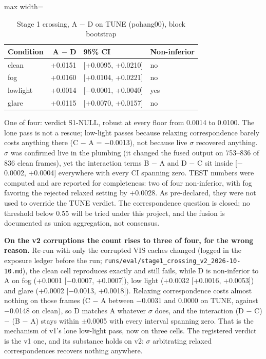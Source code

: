 \documentclass[journal,onecolumn]{IEEEtran}
\begin{document}
\begin{table}[htbp]
\centering
\small
\caption{Stage 1 crossing, A $-$ D on TUNE (pohang00), block bootstrap}
\label{tab:13}
\begin{adjustbox}{max width=\linewidth}
\begin{tabular}{lrll}
\toprule
Condition & A $-$ D & 95\% CI & Non-inferior \\
\midrule
clean & +0.0151 & [+0.0095, +0.0210] & no \\
fog & +0.0160 & [+0.0104, +0.0221] & no \\
lowlight & +0.0014 & [$-$0.0001, +0.0040] & yes \\
glare & +0.0115 & [+0.0070, +0.0157] & no \\
\bottomrule
\end{tabular}
\end{adjustbox}
\end{table}
One of four: verdict S1-NULL, robust at every floor from 0.0014 to 0.0100. The lone pass is not a rescue; low-light passes because relaxing correspondence barely costs anything there (C $-$ A = $-$0.0013), not because live $\sigma$ recovered anything. $\sigma$ was confirmed live in the plumbing (it changed the fused output on 753--836 of 836 clean frames), yet the interaction terms B $-$ A and D $-$ C sit inside [$-$0.0002, +0.0004] everywhere with every CI spanning zero. TEST numbers were computed and are reported for completeness: two of four non-inferior, with fog favoring the rejected relaxed setting by +0.0028. As pre-declared, they were not used to override the TUNE verdict. The correspondence question is closed; no threshold below 0.55 will be tried under this project, and the fusion is documented as union aggregation, not consensus.

\textbf{On the v2 corruptions the count rises to three of four, for the wrong reason.} Re-run with only the corrupted VIS caches changed (logged in the exposure ledger before the run; \texttt{runs/\allowbreak{}eval/\allowbreak{}stage1\_\allowbreak{}crossing\_\allowbreak{}v2\_\allowbreak{}2026-\allowbreak{}10-\allowbreak{}10.md}), the clean cell reproduces exactly and still fails, while D is non-inferior to A on fog (+0.0001 [$-$0.0007, +0.0007]), low light (+0.0032 [+0.0016, +0.0053]) and glare (+0.0002 [$-$0.0013, +0.0018]). Relaxing correspondence costs almost nothing on those frames (C $-$ A between $-$0.0031 and 0.0000 on TUNE, against $-$0.0148 on clean), so D matches A whatever $\sigma$ does, and the interaction (D $-$ C) $-$ (B $-$ A) stays within $\pm$0.0005 with every interval spanning zero. That is the mechanism of v1's lone low-light pass, now on three cells. The registered verdict is the v1 one, and its substance holds on v2: $\sigma$ arbitrating relaxed correspondences recovers nothing anywhere.
\end{document}
